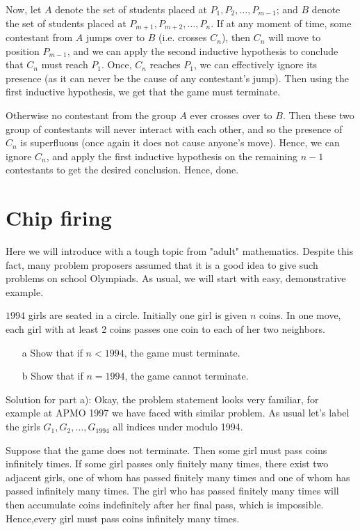 Now, let $A$ denote the set of students placed at $P_1,P_2, \dots ,P_{m-1}$; and $B$ denote the set of students placed at $P_{m+1},P_{m+2}, \dots ,P_n$. If at any moment of time, some contestant from $A$ jumps over to $B$ (i.e. crosses $C_n$), then $C_n$ will move to position $P_{m-1}$, and we can apply the second inductive hypothesis to conclude that $C_n$ must reach $P_1$. Once, $C_n$ reaches $P_1$, we can effectively ignore its presence (as it can never be the cause of any contestant's jump). Then using the first inductive hypothesis, we get that the game must terminate.

Otherwise no contestant from the group $A$ ever crosses over to $B$. Then these two group of contestants will never interact with each other, and so the presence of $C_n$ is superfluous (once again it does not cause anyone's move). Hence, we can ignore $C_n$, and apply the first inductive hypothesis on the remaining $n-1$ contestants to get the desired conclusion. Hence, done.

\section{Chip firing}

Here we will introduce with a tough topic from "adult" mathematics. Despite this fact, many problem proposers assumed that it is a good idea to give such problems on school Olympiads. As usual, we will start with easy, demonstrative example. 

\begin{example}[ISL 1994]
    $1994$ girls are seated in a circle. Initially one girl is given $n$ coins. In one move, each girl with at least 2 coins passes one coin to each of her two neighbors. 
    \begin{itemize}
        \item[a] Show that if $n<1994$, the game must terminate.
        \item[b] Show that if $n=1994$, the game cannot terminate.
    \end{itemize}
\end{example}

\sol 

Solution for part a): Okay, the problem statement looks very familiar, for example at APMO 1997 we have faced with similar problem. As usual let's label the girls $G_1, G_2, \dots, G_{1994}$ all indices under modulo 1994.

Suppose that the game does not terminate. Then some girl must pass coins infinitely times. If some girl passes only finitely many times, there exist two adjacent girls, one of whom has passed finitely many times and one of whom has passed infinitely many times. The girl who has passed finitely many times will then accumulate coins indefinitely after her final pass, which is impossible. Hence,every girl must pass coins infinitely many times. 

